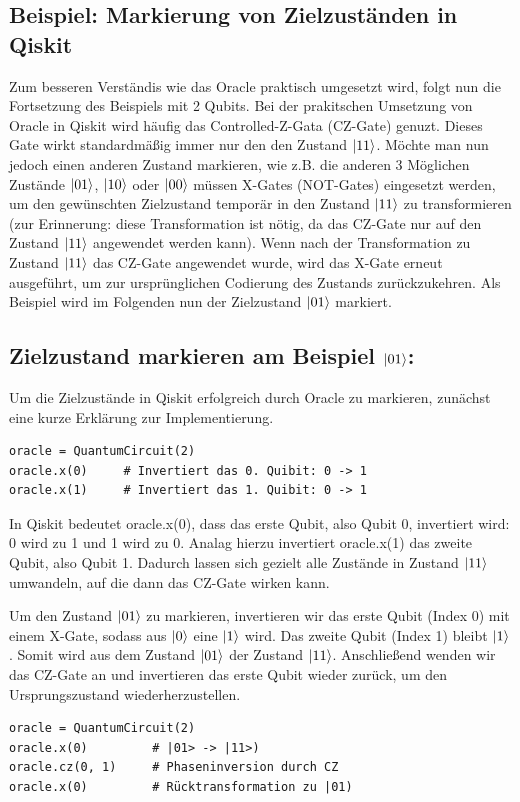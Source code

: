 \subsection*{Beispiel: Markierung von Zielzuständen in Qiskit}
Zum besseren Verständis wie das Oracle praktisch umgesetzt wird, folgt nun die Fortsetzung des Beispiels mit 2 Qubits. Bei der prakitschen Umsetzung von Oracle in Qiskit wird häufig das Controlled-Z-Gata (CZ-Gate) genuzt. Dieses Gate wirkt standardmäßig immer nur den den Zustand $\ket{11}$. Möchte man nun jedoch einen anderen Zustand markieren, wie z.B. die anderen 3 Möglichen Zustände $\ket{01}$, $\ket{10}$ oder $\ket{00}$ müssen X-Gates (NOT-Gates) eingesetzt werden, um den gewünschten Zielzustand temporär in den Zustand $\ket{11}$ zu transformieren (zur Erinnerung: diese Transformation ist nötig, da das CZ-Gate nur auf den Zustand $\ket{11}$ angewendet werden kann). Wenn nach der Transformation zu Zustand $\ket{11}$ das CZ-Gate angewendet wurde, wird das X-Gate erneut ausgeführt, um zur ursprünglichen Codierung des Zustands zurückzukehren.
Als Beispiel wird im Folgenden nun der Zielzustand $\ket{01}$ markiert.


\subsection*{Zielzustand markieren am Beispiel $\ket{01}$:}
Um die Zielzustände in Qiskit erfolgreich durch Oracle zu markieren, zunächst eine kurze Erklärung zur Implementierung. 
\begin{verbatim}
oracle = QuantumCircuit(2)
oracle.x(0)     # Invertiert das 0. Quibit: 0 -> 1
oracle.x(1)     # Invertiert das 1. Quibit: 0 -> 1
\end{verbatim}
In Qiskit bedeutet oracle.x(0), dass das erste Qubit, also Qubit 0, invertiert wird: 0 wird zu 1 und 1 wird zu 0. Analag hierzu invertiert oracle.x(1) das zweite Qubit, also Qubit 1. Dadurch lassen sich gezielt alle Zustände in Zustand $\ket{11}$ umwandeln, auf die dann das CZ-Gate wirken kann. 


Um den Zustand $\ket{01}$ zu markieren, invertieren wir das erste Qubit (Index 0) mit einem X-Gate, sodass aus $\ket{0}$ eine $\ket{1}$ wird. Das zweite Qubit (Index 1) bleibt $\ket{1}$. Somit wird aus dem Zustand $\ket{01}$ der Zustand $\ket{11}$. Anschließend wenden wir das CZ-Gate an und invertieren das erste Qubit wieder zurück, um den Ursprungszustand wiederherzustellen.
\begin{verbatim}
oracle = QuantumCircuit(2)
oracle.x(0)         # |01> -> |11>)
oracle.cz(0, 1)     # Phaseninversion durch CZ
oracle.x(0)         # Rücktransformation zu |01)
\end{verbatim}

